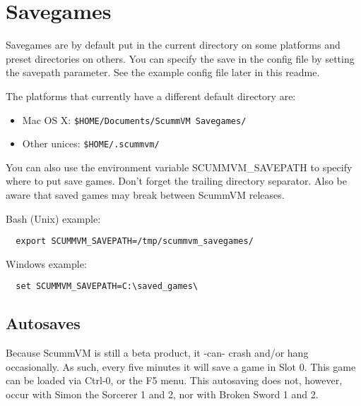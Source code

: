 \section{Savegames}

Savegames are by default put in the current directory on some platforms and
preset directories on others.  You can specify the save in the config file by
setting the savepath parameter. See the example config file later in this
readme.

The platforms that currently have a different default directory are:
%
\begin{itemize}
\item Mac OS X: \verb#$HOME/Documents/ScummVM Savegames/#
\item Other unices: \verb#$HOME/.scummvm/#
\end{itemize}
%
You can also use the environment variable SCUMMVM\_SAVEPATH to specify where to
put save games. Don't forget the trailing directory separator. Also be aware
that saved games may break between ScummVM releases.

Bash (Unix) example:
\begin{verbatim}
  export SCUMMVM_SAVEPATH=/tmp/scummvm_savegames/
\end{verbatim}
Windows example:
\begin{verbatim}
  set SCUMMVM_SAVEPATH=C:\saved_games\
\end{verbatim}


\subsection{Autosaves}

Because ScummVM is still a beta product, it -can- crash and/or hang
occasionally. As such, every five minutes it will save a game in Slot 0. This
game can be loaded via Ctrl-0, or the F5 menu. This autosaving does not,
however, occur with Simon the Sorcerer 1 and 2, nor with Broken Sword 1 and 2.


